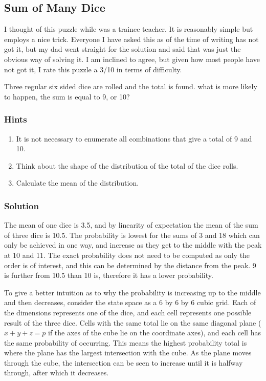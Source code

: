 
\subsection{Sum of Many Dice}

I thought of this puzzle while  was a trainee teacher. It is reasonably simple but employs a nice trick. Everyone I have asked this as of the time of writing has not got it, but my dad went straight for the solution and said that was just the obvious way of solving it. I am inclined to agree, but given how most people have not got it, I rate this puzzle a 3/10 in terms of difficulty.

Three regular six sided dice are rolled and the total is found. what is more likely to happen, the sum is equal to 9, or 10?

\subsubsection{Hints}

\begin{enumerate}
    \item It is not necessary to enumerate all combinations that give a total of 9 and 10.
    \item Think about the shape of the distribution of the total of the dice rolls.
    \item Calculate the mean of the distribution.
\end{enumerate}

\subsubsection{Solution}

The mean of one dice is 3.5, and by linearity of expectation the mean of the sum of three dice is 10.5. The probability is lowest for the sums of 3 and 18 which can only be achieved in one way, and increase as they get to the middle with the peak at 10 and 11. The exact probability does not need to be computed as only the order is of interest, and this can be determined by the distance from the peak. 9 is further from 10.5 than 10 is, therefore it has a lower probability.

To give a better intuition as to why the probability is increasing up to the middle and then decreases, consider the state space as a 6 by 6 by 6 cubic grid. Each of the dimensions represents one of the dice, and each cell represents one possible result of the three dice. Cells with the same total lie on the same diagonal plane ($x + y + z = p$ if the axes of the cube lie on the coordinate axes), and each cell has the same probability of occurring. This means the highest probability total is where the plane has the largest intersection with the cube. As the plane moves through the cube, the intersection can be seen to increase until it is halfway through, after which it decreases.

